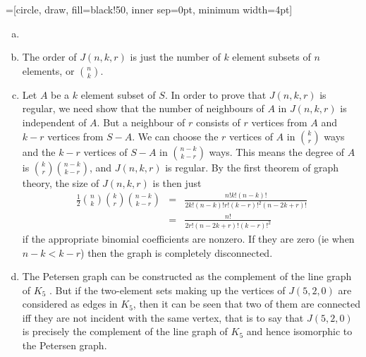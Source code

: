 =[circle, draw, fill=black!50,
	                        inner sep=0pt, minimum width=4pt]
\begin{enumerate}[(a)]
\item \ \\
	

\item The order of $J(n,k,r)$ is just the number of $k$ element subsets of $n$
	elements, or ${n \choose k}$.

\item Let $A$ be a $k$ element subset of $S$. In order to prove that 
	$J(n,k,r)$ is regular, we need show that the number of neighbours of $A$ in
	$J(n,k,r)$ is independent of $A$. But a neighbour of $r$ consists of $r$ vertices
	from $A$ and $k-r$ vertices from $S-A$. We can choose the $r$ vertices of $A$ in
	${k \choose r}$ ways and the $k-r$ vertices of $S-A$ in ${{n-k} \choose {k-r}}$ ways.
	This means the degree of $A$ is ${k \choose r}{{n-k} \choose {k-r}}$, and $J(n,k,r)$
	is regular. By the first
	theorem of graph theory, the size of $J(n,k,r)$ is then just 
	\begin{eqnarray*}
		\frac{1}{2}{n \choose k}{k \choose r}{{n-k} \choose {k-r}} &=& 
		\frac{n!k!(n-k)!}{2k!(n-k)!r!(k-r)!^2(n-2k+r)!}\\
		&=& \frac{n!}{2r!(n-2k+r)!(k-r)!^2}
	\end{eqnarray*}
	if the appropriate binomial coefficients are nonzero. If they are zero (ie when
	$n-k<k-r$) then the graph is completely disconnected.

\item The Petersen graph can be constructed 
	as the complement of the line graph of $K_5$ \cite{petersenwiki}.
	But if the two-element sets making up the vertices of $J(5,2,0)$ are considered
	as edges in $K_5$, then it can be seen that two of them are connected iff they
	are not incident with the same vertex, that is to say
	that $J(5,2,0)$ is precisely the complement
	of the line graph of $K_5$ and hence isomorphic to the Petersen graph.
\end{enumerate}
